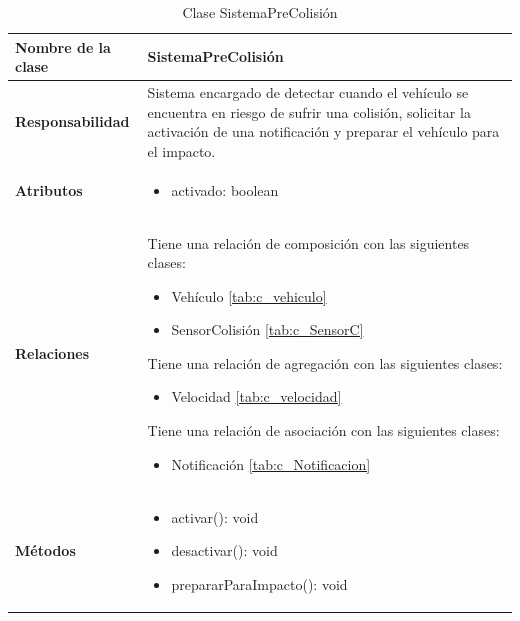 \begin{table}[h]
\begin{center}
\begin{tabular}{p{} p{11cm}}
\textbf{Nombre de la clase} &  SistemaPreColisión\\ \hline \hline
\textbf{Responsabilidad} &  Sistema encargado de detectar cuando el vehículo se encuentra en riesgo de sufrir una colisión, solicitar la activación de una notificación y preparar el vehículo para el impacto.  \\ \hline
\textbf{Atributos} & \begin{itemize}
                      \item activado: boolean
                    \end{itemize}\\ \hline
\textbf{Relaciones} & \par Tiene una relación de composición con las siguientes clases:
                      \begin{itemize}
                        \item Vehículo \ref{tab:c_vehiculo}
                        \item SensorColisión \ref{tab:c_SensorC}
                      \end{itemize}

                      \par Tiene una relación de agregación con las siguientes clases:
                      \begin{itemize}
                        \item Velocidad \ref{tab:c_velocidad}
                      \end{itemize}

                      \par Tiene una relación de asociación con las siguientes clases:
                      \begin{itemize}
                        \item Notificación \ref{tab:c_Notificacion}
                      \end{itemize}


                      \\ \hline

\textbf{Métodos} &  \begin{itemize}
                      \item activar(): void
                      \item desactivar(): void
                      \item prepararParaImpacto(): void
                    \end{itemize}\\ \hline
\end{tabular}
\caption{Clase SistemaPreColisión}
\label{tab:c_SPColision}
\end{center}
\end{table}









